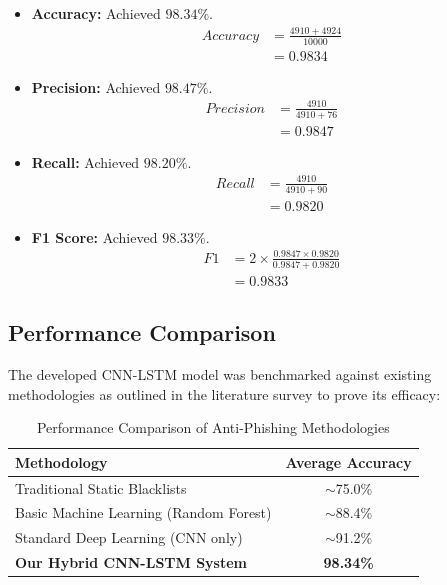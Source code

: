 \begin{itemize}
    \item \textbf{Accuracy:} Achieved $\mathbf{98.34\%}$.
    \begin{align*}
        Accuracy &= \frac{4910 + 4924}{10000} \\
                 &= 0.9834
    \end{align*}
    
    \item \textbf{Precision:} Achieved $\mathbf{98.47\%}$.
    \begin{align*}
        Precision &= \frac{4910}{4910 + 76} \\
                  &= 0.9847
    \end{align*}
    
    \item \textbf{Recall:} Achieved $\mathbf{98.20\%}$.
    \begin{align*}
        Recall &= \frac{4910}{4910 + 90} \\
               &= 0.9820
    \end{align*}
    
    \item \textbf{F1 Score:} Achieved $\mathbf{98.33\%}$.
    \begin{align*}
        F1 &= 2 \times \frac{0.9847 \times 0.9820}{0.9847 + 0.9820} \\
           &= 0.9833
    \end{align*}
\end{itemize}

\subsection{Performance Comparison}
The developed CNN-LSTM model was benchmarked against existing methodologies as outlined in the literature survey to prove its efficacy:

\begin{table}[htbp]
    \centering
    \renewcommand{\arraystretch}{1.5}
    \begin{tabular}{|l|c|}
        \hline
        \textbf{Methodology} & \textbf{Average Accuracy} \\ 
        \hline
        Traditional Static Blacklists & $\sim$75.0\% \\ 
        \hline
        Basic Machine Learning (Random Forest) & $\sim$88.4\% \\ 
        \hline
        Standard Deep Learning (CNN only) & $\sim$91.2\% \\ 
        \hline
        \textbf{Our Hybrid CNN-LSTM System} & \textbf{98.34\%} \\ 
        \hline
    \end{tabular}
    \vspace{0.2cm}
    \caption{Performance Comparison of Anti-Phishing Methodologies}
\end{table}

